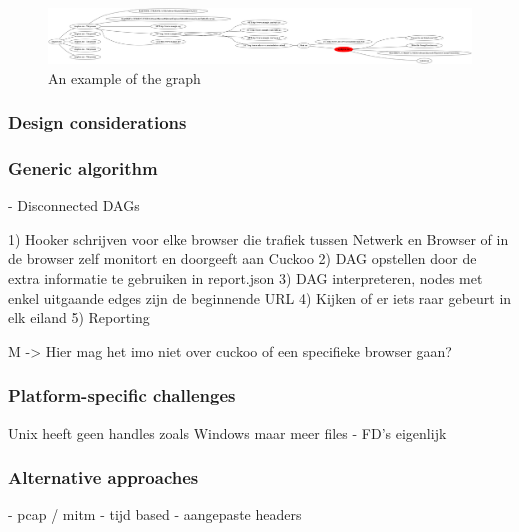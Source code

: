 
\begin{figure}[h]
    \centering
    \includegraphics[width=17cm]{Images/alg_tree.png}
    \caption{An example of the graph}
    \label{fig:alg_tree}
\end{figure}

\subsubsection{Design considerations}

\subsubsection{Generic algorithm}

- Disconnected DAGs

1) Hooker schrijven voor elke browser die trafiek tussen Netwerk en Browser of in de browser zelf monitort en doorgeeft aan Cuckoo
2) DAG opstellen door de extra informatie te gebruiken in report.json
3) DAG interpreteren, nodes met enkel uitgaande edges zijn de beginnende URL
4) Kijken of er iets raar gebeurt in elk eiland
5) Reporting

M -> Hier mag het imo niet over cuckoo of een specifieke browser gaan?

\subsubsection{Platform-specific challenges}

Unix heeft geen handles zoals Windows maar meer files
	- FD's eigenlijk

\subsubsection{Alternative approaches}

- pcap / mitm
- tijd based
- aangepaste headers